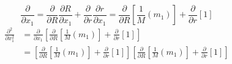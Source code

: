 \documentclass{article}
\begin{document}
{\begin{enumerate}
		\[
			\frac{\partial}{\partial x_1} = \frac{\partial}{\partial R} \frac{\partial R}{\partial x_1} + \frac{\partial}{\partial r} \frac{\partial r}{\partial x_1} = \frac{\partial}{\partial R} \left[ \frac{1}{M} \left( m_1 \right) \right] + \frac{\partial}{\partial r} \left[ 1 \right]
		\]
		\begin{equation*}
			\begin{split}
				\frac{\partial^2}{\partial x^2_1} &= \frac{\partial}{\partial x_1} \left[ \frac{\partial}{\partial R} \left[ \frac{1}{M} \left( m_1 \right) \right] + \frac{\partial}{\partial r} \left[ 1 \right] \right] \\
				&= \left[ \frac{\partial}{\partial R} \left[ \frac{1}{M} \left( m_1 \right) \right] + \frac{\partial}{\partial r} \left[ 1 \right] \right] \left[ \frac{\partial}{\partial R} \left[ \frac{1}{M} \left( m_1 \right) \right] + \frac{\partial}{\partial r} \left[ 1 \right] \right] \\

\end{split}
\end{equation*}
\end{enumerate}}
\end{document}

